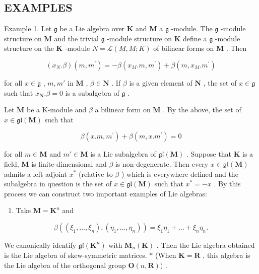 \subsection{EXAMPLES}

Example 1. Let \(\mathfrak{g}\) be a Lie algebra over \(\mathbf{K}\) and \(\mathbf{M}\) a \(\mathfrak{g}\) -module. The \(\mathfrak{g}\) -module structure on \(\mathbf{M}\) and the trivial \(\mathfrak{g}\) -module structure on \(\mathbf{K}\) define a \(\mathfrak{g}\) -module structure on the \(\mathbf{K}\) -module \(N = \mathcal{L}(M, M; K)\) of bilinear forms on \(\mathbf{M}\) . Then

\[
(x _ {N}. \beta) (m, m ^ {\prime}) = - \beta (x _ {M}. m, m ^ {\prime}) + \beta (m, x _ {M}. m ^ {\prime})\tag{10}
\]

for all \(x \in \mathfrak{g}\) , \(m, m'\) in \(\mathbf{M}\) , \(\beta \in \mathbf{N}\) . If \(\beta\) is a given element of \(\mathbf{N}\) , the set of \(x \in \mathfrak{g}\) such that \(x_{\mathbf{N}}. \beta = 0\) is a subalgebra of \(\mathfrak{g}\) .

Let \(\mathbf{M}\) be a K-module and \(\beta\) a bilinear form on \(\mathbf{M}\) . By the above, the set of \(x \in \mathfrak{gl}(\mathbf{M})\) such that

\[
\beta (x. m, m ^ {\prime}) + \beta (m, x. m ^ {\prime}) = 0
\]

for all \(m \in \mathbf{M}\) and \(m' \in \mathbf{M}\) is a Lie subalgebra of \(\mathfrak{gl}(\mathbf{M})\) . Suppose that \(\mathbf{K}\) is a field, \(\mathbf{M}\) is finite-dimensional and \(\beta\) is non-degenerate. Then every \(x \in \mathfrak{gl}(\mathbf{M})\) admits a left adjoint \(x^*\) (relative to \(\beta\) ) which is everywhere defined and the subalgebra in question is the set of \(x \in \mathfrak{gl}(\mathbf{M})\) such that \(x^* = -x\) . By this process we can construct two important examples of Lie algebras:

\begin{enumerate}
\def\labelenumi{(\alph{enumi})}
\tightlist
\item
  Take \(\mathbf{M} = \mathbf{K}^n\) and
\end{enumerate}

\[
\beta ((\xi_ {1}, \dots , \xi_ {n}), (\eta_ {1}, \dots , \eta_ {n})) = \xi_ {1} \eta_ {1} + \dots + \xi_ {n} \eta_ {n}.
\]

We canonically identify \(\mathfrak{gl}(\mathbf{K}^n)\) with \(\mathbf{M}_n(\mathbf{K})\) . Then the Lie algebra obtained is the Lie algebra of skew-symmetric matrices. \(*\) (When \(\mathbf{K} = \mathbf{R}\) , this algebra is the Lie algebra of the orthogonal group \(\mathbf{O}(n, \mathbf{R}))\) .

